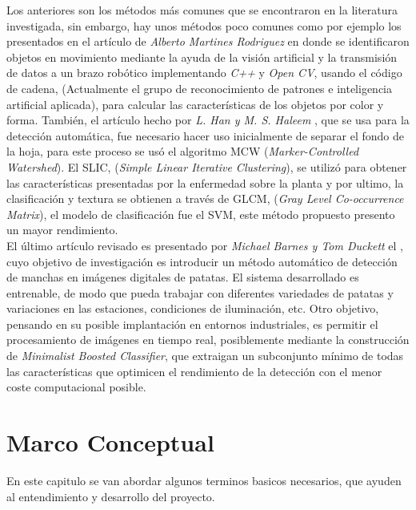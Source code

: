 	Los anteriores son los métodos más comunes que se encontraron en la literatura investigada, sin embargo, hay unos métodos poco comunes como por ejemplo los presentados en el artículo de \textit{Alberto Martines Rodriguez} \cite{article5} en donde se identificaron objetos en movimiento mediante la ayuda de la visión artificial y la transmisión de datos a un brazo robótico implementando \textit{C++} y \textit{Open CV}, usando el código de cadena, (Actualmente el grupo de reconocimiento de patrones e inteligencia artificial aplicada), para calcular las características de los objetos por color y forma. También, el artículo hecho por \textit{L. Han y M. S. Haleem} \cite{7237209}, que se usa para la detección automática, fue necesario hacer uso inicialmente de separar el fondo de la hoja, para este proceso se usó el algoritmo MCW (\textit{Marker-Controlled Watershed}). El SLIC, (\textit{Simple Linear Iterative Clustering}), se utilizó para obtener las características presentadas por la enfermedad sobre la planta y por ultimo, la clasificación y textura se obtienen a través de GLCM, (\textit{Gray Level Co-occurrence Matrix}), el modelo de clasificación fue el SVM, este método propuesto presento un mayor rendimiento.\\
	
	El último artículo revisado es presentado por \textit{Michael Barnes y Tom Duckett} el \cite{Barnes2010}, cuyo objetivo de  investigación es introducir un método automático de detección de manchas en imágenes digitales de patatas. El sistema desarrollado es entrenable, de modo que pueda trabajar con diferentes variedades de patatas y variaciones en las estaciones, condiciones de iluminación, etc. Otro objetivo, pensando en su posible implantación en entornos industriales, es permitir el procesamiento de imágenes en tiempo real, posiblemente mediante la construcción de \textit{Minimalist Boosted Classifier}, que extraigan un subconjunto mínimo de todas las características que optimicen el rendimiento de la detección con el menor coste computacional posible.


\chapter{Marco Conceptual}
	En este capitulo se van abordar algunos terminos basicos necesarios, que ayuden al entendimiento y desarrollo del proyecto. 
